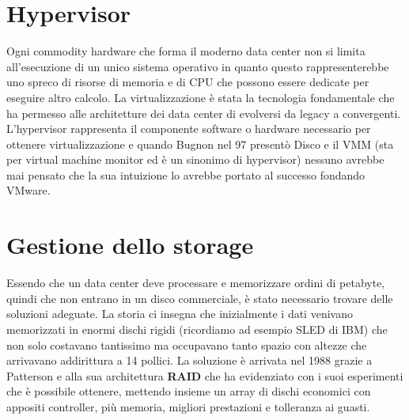 \section{Hypervisor}
Ogni commodity hardware che forma il moderno data center non si limita all'esecuzione di un unico sistema operativo in quanto questo rappresenterebbe uno spreco di risorse di memoria e di CPU che possono essere dedicate per eseguire altro calcolo. La virtualizzazione è stata la tecnologia fondamentale che ha permesso alle architetture dei data center di evolversi da legacy a convergenti. L'hypervisor rappresenta il componente software o hardware necessario per ottenere virtualizzazione e quando Bugnon nel 97 presentò Disco\cite{bugnon97} e il VMM (sta per virtual machine monitor ed è un sinonimo di hypervisor) nessuno avrebbe mai pensato che la sua intuizione lo avrebbe portato al successo fondando VMware.
\section{Gestione dello storage}
Essendo che un data center deve processare e memorizzare ordini di petabyte, quindi che non entrano in un disco commerciale, è stato necessario trovare delle soluzioni adeguate. La storia ci insegna che inizialmente i dati venivano memorizzati in enormi dischi rigidi (ricordiamo ad esempio SLED di IBM) che non solo costavano tantissimo ma occupavano tanto spazio con altezze che arrivavano addirittura a 14 pollici. La soluzione è arrivata nel 1988 grazie a Patterson e alla sua architettura \textbf{RAID} che ha evidenziato con i suoi esperimenti\cite{patterson88} che è possibile ottenere, mettendo insieme un array di dischi economici con appositi controller, più memoria, migliori prestazioni e tolleranza ai guasti.
